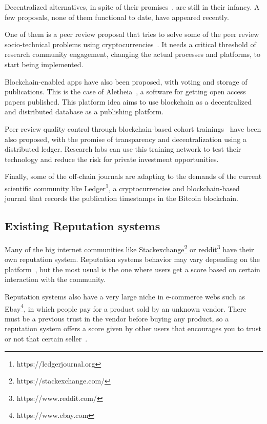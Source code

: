 Decentralized alternatives, in spite of their
promises~\cite{bartlingblockchain}, are still in their infancy. A few proposals,
none of them functional to date, have appeared recently.

One of them is a peer review proposal that tries to solve some of the peer
review socio-technical problems using cryptocurrencies~\cite{tennant2017multi}.
It needs a critical threshold of research community engagement, changing the
actual processes and platforms, to start being implemented.

Blockchain-enabled apps have also been proposed, with voting and storage of
publications. This is the case of Aletheia~\cite{morton2017aletheia}, a software
for getting open access papers published. This platform idea aims to use
blockchain as a decentralized and distributed database as a publishing platform.

Peer review quality control through blockchain-based cohort
trainings~\cite{dhillon2016bench} have been also proposed, with the promise of
transparency and decentralization using a distributed ledger. Research labs can
use this training network to test their technology and reduce the risk for
private investment opportunities.

Finally, some of the off-chain journals are adapting to the demands of the
current scientific community like Ledger\footnote{https://ledgerjournal.org}, a
cryptocurrencies and blockchain-based journal that records the publication
timestamps in the Bitcoin blockchain.

\subsection{Existing Reputation systems}
\label{soa:rs}
Many of the big internet communities like
Stackexchange\footnote{https://stackexchange.com/} or
reddit\footnote{https://www.reddit.com/} have their own reputation system.
Reputation systems behavior may vary depending on the
platform~\cite{josang2002beta}, but the most usual is the one where users get a
score based on certain interaction with the community.

Reputation systems also have a very large niche in e-commerce webs such as
Ebay\footnote{https://www.ebay.com}, in which people pay for a product sold by
an unknown vendor. There must be a previous trust in the vendor before buying
any product, so a reputation system offers a score given by other users that
encourages you to trust or not that certain seller~\cite{resnick2002trust}.


